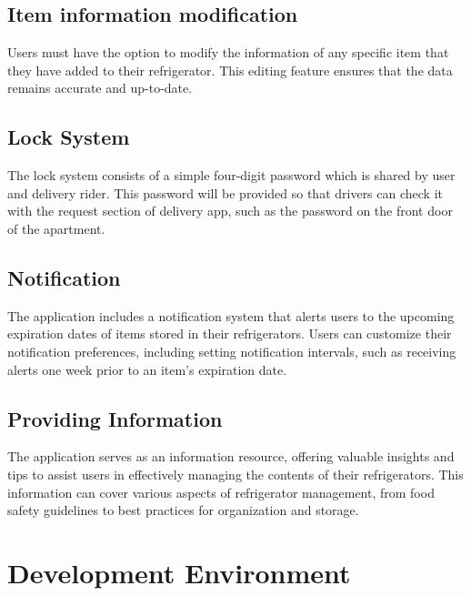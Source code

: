 \documentclass[conference]{IEEEtran}
\begin{document}
\subsection{Item information modification}
Users must have the option to modify the information of any specific item that they have added to their refrigerator. This editing feature ensures that the data remains accurate and up-to-date.

\subsection{Lock System}
The lock system consists of a simple four-digit password which is shared by user and delivery rider. This password will be provided so that drivers can check it with the request section of delivery app, such as the password on the front door of the apartment.


\subsection{Notification}
The application includes a notification system that alerts users to the upcoming expiration dates of items stored in their refrigerators. Users can customize their notification preferences, including setting notification intervals, such as receiving alerts one week prior to an item's expiration date.

\subsection{Providing Information}
The application serves as an information resource, offering valuable insights and tips to assist users in effectively managing the contents of their refrigerators. This information can cover various aspects of refrigerator management, from food safety guidelines to best practices for organization and storage.

\section{Development Environment}
\end{document}
